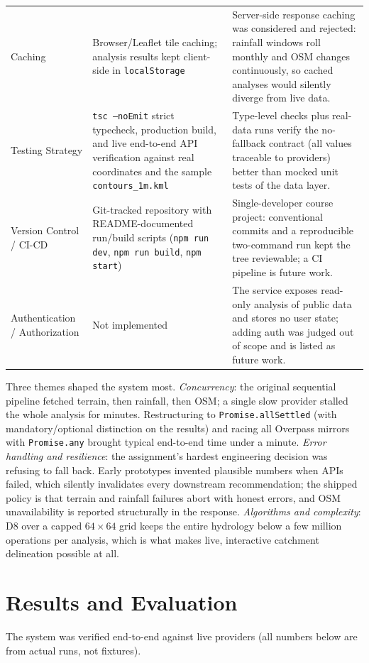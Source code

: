 \documentclass[manuscript,screen,review]{acmart}
\begin{document}
\begin{table}[t]
\begin{tabular}{p{2.2cm}p{4.0cm}p{5.6cm}}
    Caching & Browser/Leaflet tile caching; analysis results kept client-side in \texttt{localStorage} & Server-side response caching was considered and rejected: rainfall windows roll monthly and OSM changes continuously, so cached analyses would silently diverge from live data. \\
    Testing Strategy & \texttt{tsc --noEmit} strict typecheck, production build, and live end-to-end API verification against real coordinates and the sample \texttt{contours\_1m.kml} & Type-level checks plus real-data runs verify the no-fallback contract (all values traceable to providers) better than mocked unit tests of the data layer. \\
    Version Control / CI-CD & Git-tracked repository with README-documented run/build scripts (\texttt{npm run dev}, \texttt{npm run build}, \texttt{npm start}) & Single-developer course project: conventional commits and a reproducible two-command run kept the tree reviewable; a CI pipeline is future work. \\
    Authentication / Authorization & Not implemented & The service exposes read-only analysis of public data and stores no user state; adding auth was judged out of scope and is listed as future work. \\
    \bottomrule
  \end{tabular}
\end{table}

Three themes shaped the system most. \emph{Concurrency}: the original
sequential pipeline fetched terrain, then rainfall, then OSM; a single slow
provider stalled the whole analysis for minutes. Restructuring to
\texttt{Promise.allSettled} (with mandatory/optional distinction on the
results) and racing all Overpass mirrors with \texttt{Promise.any} brought
typical end-to-end time under a minute. \emph{Error handling and
resilience}: the assignment's hardest engineering decision was refusing to
fall back. Early prototypes invented plausible numbers when APIs failed,
which silently invalidates every downstream recommendation; the shipped
policy is that terrain and rainfall failures abort with honest errors, and
OSM unavailability is reported structurally in the response.
\emph{Algorithms and complexity}: D8 over a capped $64\times64$ grid keeps
the entire hydrology below a few million operations per analysis, which is
what makes live, interactive catchment delineation possible at all.

\section{Results and Evaluation}
\label{sec:results}
The system was verified end-to-end against live providers (all numbers below
are from actual runs, not fixtures).
\end{document}
